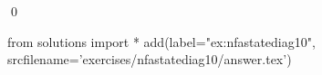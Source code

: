 
\begin{ex} 
  \label{ex:nfastatediag10}
  
  \qed
\end{ex} 
\begin{python0}
from solutions import *
add(label="ex:nfastatediag10",
    srcfilename='exercises/nfastatediag10/answer.tex') 
\end{python0}
